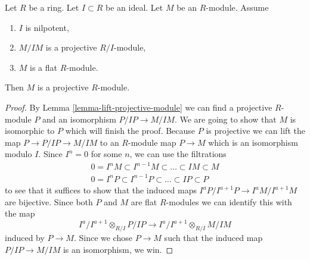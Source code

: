 \begin{lemma}
\label{lemma-lift-projective}
Let $R$ be a ring.
Let $I \subset R$ be an ideal.
Let $M$ be an $R$-module.
Assume
\begin{enumerate}
\item $I$ is nilpotent,
\item $M/IM$ is a projective $R/I$-module,
\item $M$ is a flat $R$-module.
\end{enumerate}
Then $M$ is a projective $R$-module.
\end{lemma}

\begin{proof}
By Lemma \ref{lemma-lift-projective-module} we can find a projective
$R$-module $P$ and an isomorphism $P/IP \to M/IM$. We are going to show
that $M$ is isomorphic to $P$ which will finish the proof. Because $P$
is projective we can lift the map $P \to P/IP \to M/IM$ to an $R$-module
map $P \to M$ which is an isomorphism modulo $I$. Since $I^n = 0$
for some $n$, we can use the filtrations
\begin{align*}
0 = I^nM \subset I^{n - 1}M \subset \ldots \subset IM \subset M \\
0 = I^nP \subset I^{n - 1}P \subset \ldots \subset IP \subset P
\end{align*}
to see that it suffices to show that the induced maps
$I^aP/I^{a + 1}P \to I^aM/I^{a + 1}M$ are bijective. Since both $P$
and $M$ are flat $R$-modules we can identify this with the map
$$
I^a/I^{a + 1} \otimes_{R/I} P/IP
\longrightarrow
I^a/I^{a + 1} \otimes_{R/I} M/IM
$$
induced by $P \to M$. Since we chose $P \to M$ such that the induced
map $P/IP \to M/IM$ is an isomorphism, we win.
\end{proof}

